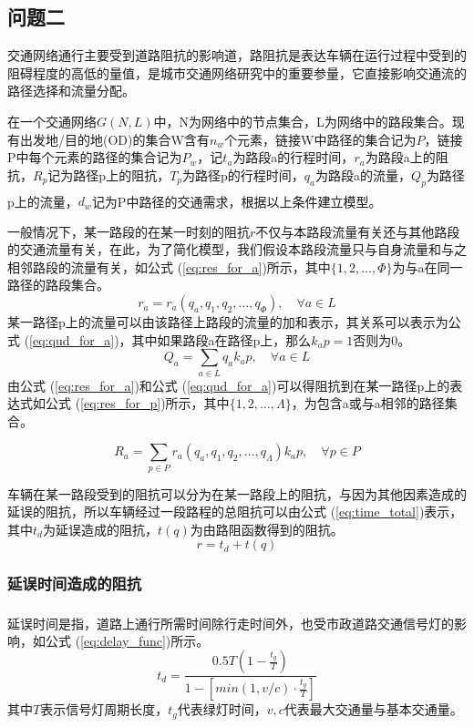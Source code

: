 \documentclass[fontset=windows,a4paper,12pt]{ctexart}
\newcommand{\upcite}[1]{\textsuperscript{\textsuperscript{\cite{#1}}}}
\renewcommand{\eqref}[1]{公式 (\ref{#1})}
\begin{document}
	\subsection{问题二}
		交通网络通行主要受到道路阻抗的影响道，路阻抗是表达车辆在运行过程中受到的阻碍程度的高低的量值，是城市交通网络研究中的重要参量，它直接影响交通流的路径选择和流量分配。
		
		在一个交通网络$G(N,L)$中，N为网络中的节点集合，L为网络中的路段集合。现有出发地/目的地(OD)的集合W含有$n_w$个元素，链接W中路径的集合记为$P$，链接P中每个元素的路径的集合记为$P_w$，记$t_a$为路段a的行程时间，$r_a$为路段a上的阻抗，$R_p$记为路径p上的阻抗，$T_p$为路径p的行程时间，$q_a$为路段a的流量，$Q_p$为路径p上的流量，$d_w$记为P中路径的交通需求，根据以上条件建立模型\upcite{赵春雪2012拥挤交通网络的}。
		
		一般情况下，某一路段的在某一时刻的阻抗$r$不仅与本路段流量有关还与其他路段的交通流量有关，在此，为了简化模型，我们假设本路段流量只与自身流量和与之相邻路段的流量有关，如\eqref{eq:res_for_a}所示，其中$\{1,2,\dots,\varPhi\}$为与a在同一路径的路段集合。
		\begin{equation}
			r_a=r_a(q_a,q_1,q_2,\dots,q_\varPhi),\quad\forall a \in L
			\label{eq:res_for_a}
		\end{equation}
		某一路径p上的流量可以由该路径上路段的流量的加和表示，其关系可以表示为\eqref{eq:qud_for_a}，其中如果路段a在路径p上，那么$k_ap=1$否则为0。
		\begin{equation}
			Q_a=\sum\limits_{a\in L}q_ak_ap,\quad\forall a \in L
			\label{eq:qud_for_a}
		\end{equation}
		由\eqref{eq:res_for_a}和\eqref{eq:qud_for_a}可以得阻抗到在某一路径p上的表达式如\eqref{eq:res_for_p}所示，其中$\{1,2,\dots,\Lambda\}$，为包含a或与a相邻的路径集合。
		
		\begin{equation}
			R_a=\sum\limits_{p\in P}r_a(q_a,q_1,q_2,\dots,q_\Lambda)k_ap,\quad\forall p \in P
			\label{eq:res_for_p}
		\end{equation}
		
		车辆在某一路段受到的阻抗可以分为在某一路段上的阻抗，与因为其他因素造成的延误的阻抗，所以车辆经过一段路程的总阻抗可以由\eqref{eq:time_total}表示，其中$ t_d $为延误造成的阻抗，$t(q)$为由路阻函数得到的阻抗。
		\begin{equation}
			r = t_d + t(q)
			\label{eq:time_total}
		\end{equation}		
		
		\subsubsection{延误时间造成的阻抗}
			延误时间\upcite{任福田2003交通工程学}是指，道路上通行所需时间除行走时间外，也受市政道路交通信号灯的影响，如\eqref{eq:delay_func}所示。
			\begin{equation}
				t_d=\frac{0.5T(1-\frac{t_g}{T})}{1-[min(1,v/c)\cdot{\frac{t_g}{T}}]}
				\label{eq:delay_func}
			\end{equation}
			其中$ T $表示信号灯周期长度，$ t_g $代表绿灯时间，$ v,c $代表最大交通量与基本交通量。
			
\end{document}
